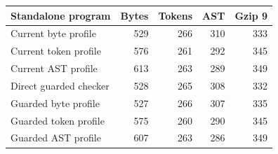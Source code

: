 \begin{center}\small
\begin{tabular}{lrrrr}
\toprule
Standalone program & Bytes & Tokens & AST & Gzip 9\\
\midrule
Current byte profile & 529 & 266 & 310 & 333\\
Current token profile & 576 & 261 & 292 & 345\\
Current AST profile & 613 & 263 & 289 & 349\\
\midrule
Direct guarded checker & 528 & 265 & 308 & 332\\
Guarded byte profile & 527 & 266 & 307 & 335\\
Guarded token profile & 575 & 260 & 290 & 345\\
Guarded AST profile & 607 & 263 & 286 & 349\\
\bottomrule
\end{tabular}
\end{center}
